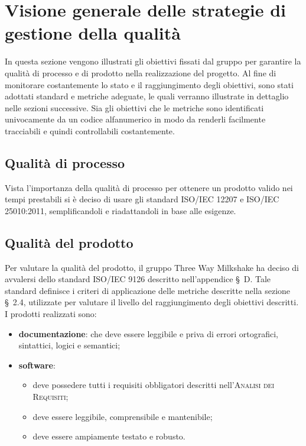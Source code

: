 \section{Visione generale delle strategie di gestione della qualità}
In questa sezione vengono illustrati gli obiettivi fissati dal gruppo per garantire la qualità di processo e di prodotto nella realizzazione del progetto.
Al fine di monitorare costantemente lo stato e il raggiungimento degli obiettivi, sono stati adottati standard e metriche adeguate, le quali verranno illustrate in dettaglio nelle sezioni successive.
Sia gli obiettivi che le metriche sono identificati univocamente da un codice alfanumerico in modo da renderli facilmente tracciabili e quindi controllabili costantemente.

\subsection{Qualità di processo}
Vista l’importanza della qualità di processo per ottenere un prodotto valido nei tempi prestabili si è deciso di usare gli standard ISO/IEC 12207 e ISO/IEC 25010:2011, semplificandoli e riadattandoli in base alle esigenze. 

\subsection{Qualità del prodotto}
Per valutare la qualità del prodotto, il gruppo Three Way Milkshake ha deciso di avvalersi dello standard ISO/IEC 9126 descritto nell'appendice \S\ D. Tale standard definisce i criteri di applicazione delle metriche descritte nella sezione \S\ 2.4, utilizzate per valutare il livello del raggiungimento degli obiettivi descritti.
I prodotti realizzati sono:
\begin{itemize}
    \item \textbf{documentazione}: che deve essere leggibile e priva di errori ortografici, sintattici, logici e semantici;
    \item \textbf{software}: 
    \begin{itemize}
        \item deve possedere tutti i requisiti obbligatori descritti nell'\textsc{Analisi dei Requisiti};
        \item deve essere leggibile, comprensibile e mantenibile;
        \item deve essere ampiamente testato e robusto.
    \end{itemize}
\end{itemize}

